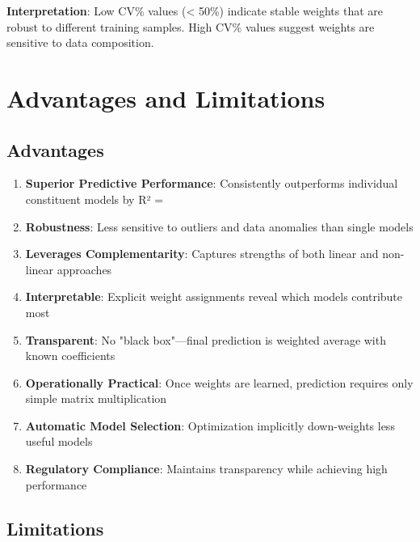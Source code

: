 \textbf{Interpretation}: Low CV\% values (< 50\%) indicate stable weights that are robust to different training samples. High CV\% values suggest weights are sensitive to data composition.

\section{Advantages and Limitations}

\subsection{Advantages}

\begin{enumerate}
    \item \textbf{Superior Predictive Performance}: Consistently outperforms individual constituent models by R² = \ModelElevenImprovementOverEqual{}
    
    \item \textbf{Robustness}: Less sensitive to outliers and data anomalies than single models
    
    \item \textbf{Leverages Complementarity}: Captures strengths of both linear and non-linear approaches
    
    \item \textbf{Interpretable}: Explicit weight assignments reveal which models contribute most
    
    \item \textbf{Transparent}: No "black box"---final prediction is weighted average with known coefficients
    
    \item \textbf{Operationally Practical}: Once weights are learned, prediction requires only simple matrix multiplication
    
    \item \textbf{Automatic Model Selection}: Optimization implicitly down-weights less useful models
    
    \item \textbf{Regulatory Compliance}: Maintains transparency while achieving high performance
\end{enumerate}

\subsection{Limitations}

